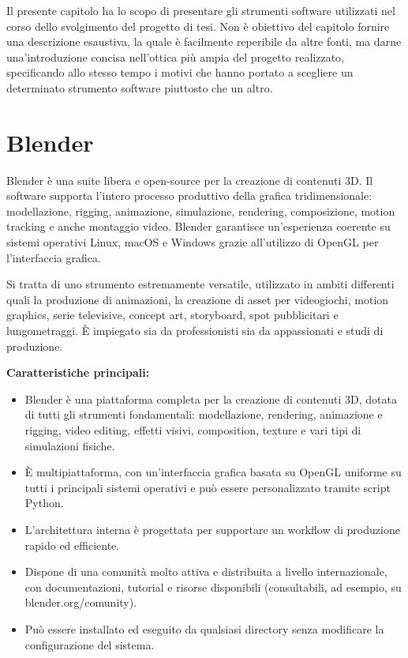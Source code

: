 Il presente capitolo ha lo scopo di presentare gli strumenti software utilizzati nel corso dello svolgimento del progetto di tesi. Non è obiettivo del capitolo fornire una descrizione esaustiva, la quale è facilmente reperibile da altre fonti, ma darne una'introduzione concisa nell'ottica più ampia del progetto realizzato, specificando allo stesso tempo i motivi che hanno portato a scegliere un determinato strumento software piuttosto che un altro. 
\section{Blender}
Blender è una suite libera e open-source per la creazione di contenuti 3D. Il software supporta l'intero processo produttivo della grafica tridimensionale: modellazione, rigging, animazione, simulazione, rendering, composizione, motion tracking e anche montaggio video.
Blender garantisce un'esperienza coerente su sistemi operativi Linux, macOS e Windows grazie all'utilizzo di OpenGL per l'interfaccia grafica.

Si tratta di uno strumento estremamente versatile, utilizzato in ambiti differenti quali la produzione di animazioni, la creazione di asset per videogiochi, motion graphics, serie televisive, concept art, storyboard, spot pubblicitari e lungometraggi. È impiegato sia da professionisti sia da appassionati e studi di produzione.


\textbf{Caratteristiche principali:}
\begin{itemize}
    \item Blender è una piattaforma completa per la creazione di contenuti 3D, dotata di tutti gli strumenti fondamentali: modellazione, rendering, animazione e rigging, video editing, effetti visivi, composition, texture e vari tipi di simulazioni fisiche.
    \item È multipiattaforma, con un'interfaccia grafica basata su OpenGL uniforme su tutti i principali sistemi operativi e può essere personalizzato tramite script Python.
    \item L'architettura interna è progettata per supportare un workflow di produzione rapido ed efficiente.
    \item Dispone di una comunità molto attiva e distribuita a livello internazionale, con documentazioni, tutorial e risorse disponibili (consultabili, ad esempio, su blender.org/comunity).
    \item Può essere installato ed eseguito da qualsiasi directory senza modificare la configurazione del sistema.
\end{itemize}

